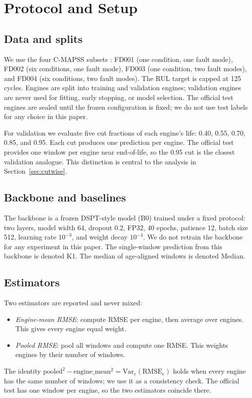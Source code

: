 \section{Protocol and Setup}
\label{sec:setup}

\subsection{Data and splits}

We use the four C-MAPSS subsets \cite{saxena2008}: FD001 (one condition, one
fault mode), FD002 (six conditions, one fault mode), FD003 (one condition, two
fault modes), and FD004 (six conditions, two fault modes). The RUL target is
capped at 125 cycles. Engines are split into training and validation engines;
validation engines are never used for fitting, early stopping, or model
selection. The official test engines are sealed until the frozen configuration
is fixed; we do not use test labels for any choice in this paper.

For validation we evaluate five cut fractions of each engine's life:
0.40, 0.55, 0.70, 0.85, and 0.95. Each cut produces one prediction per engine.
The official test provides one window per engine near end-of-life, so the 0.95
cut is the closest validation analogue. This distinction is central to the
analysis in Section~\ref{sec:cutwise}.

\subsection{Backbone and baselines}

The backbone is a frozen DSPT-style model (B0) trained under a fixed protocol:
two layers, model width 64, dropout 0.2, FP32, 40 epochs, patience 12, batch
size 512, learning rate $10^{-3}$, and weight decay $10^{-4}$. We do not retrain
the backbone for any experiment in this paper. The single-window prediction from
this backbone is denoted K1. The median of age-aligned windows is denoted Median.

\subsection{Estimators}

Two estimators are reported and never mixed:
\begin{itemize}
\item \emph{Engine-mean RMSE}: compute RMSE per engine, then average over
engines. This gives every engine equal weight.
\item \emph{Pooled RMSE}: pool all windows and compute one RMSE. This weights
engines by their number of windows.
\end{itemize}
The identity $\mathrm{pooled}^2-\mathrm{engine\_mean}^2=\mathrm{Var}_e(\mathrm{RMSE}_e)$
holds when every engine has the same number of windows; we use it as a
consistency check. The official test has one window per engine, so the two
estimators coincide there.


